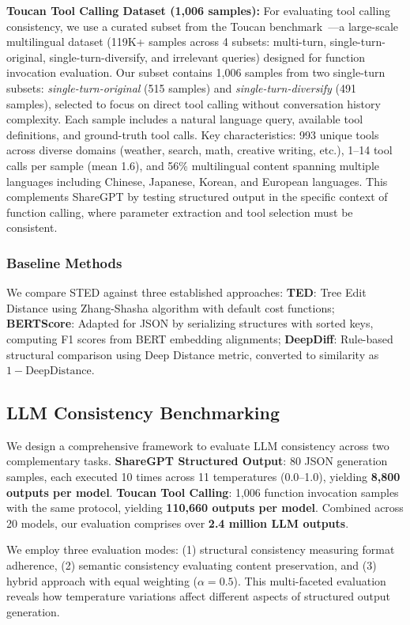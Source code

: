\documentclass{article}
\begin{document}
\textbf{Toucan Tool Calling Dataset (1,006 samples):} For evaluating tool calling consistency, we use a curated subset from the Toucan benchmark~\cite{toucan2024}---a large-scale multilingual dataset (119K+ samples across 4 subsets: multi-turn, single-turn-original, single-turn-diversify, and irrelevant queries) designed for function invocation evaluation. Our subset contains 1,006 samples from two single-turn subsets: \textit{single-turn-original} (515 samples) and \textit{single-turn-diversify} (491 samples), selected to focus on direct tool calling without conversation history complexity. Each sample includes a natural language query, available tool definitions, and ground-truth tool calls. Key characteristics: 993 unique tools across diverse domains (weather, search, math, creative writing, etc.), 1--14 tool calls per sample (mean 1.6), and 56\% multilingual content spanning multiple languages including Chinese, Japanese, Korean, and European languages. This complements ShareGPT by testing structured output in the specific context of function calling, where parameter extraction and tool selection must be consistent.

\subsubsection{Baseline Methods}
We compare STED against three established approaches: \textbf{TED}: Tree Edit Distance using Zhang-Shasha algorithm with default cost functions; \textbf{BERTScore}: Adapted for JSON by serializing structures with sorted keys, computing F1 scores from BERT embedding alignments; \textbf{DeepDiff}: Rule-based structural comparison using Deep Distance metric, converted to similarity as $1 - \text{DeepDistance}$.

\subsection{LLM Consistency Benchmarking}

We design a comprehensive framework to evaluate LLM consistency across two complementary tasks. \textbf{ShareGPT Structured Output}: 80 JSON generation samples, each executed 10 times across 11 temperatures (0.0--1.0), yielding \textbf{8,800 outputs per model}. \textbf{Toucan Tool Calling}: 1,006 function invocation samples with the same protocol, yielding \textbf{110,660 outputs per model}. Combined across 20 models, our evaluation comprises over \textbf{2.4 million LLM outputs}.

We employ three evaluation modes: (1) structural consistency measuring format adherence, (2) semantic consistency evaluating content preservation, and (3) hybrid approach with equal weighting ($\alpha = 0.5$). This multi-faceted evaluation reveals how temperature variations affect different aspects of structured output generation.
\end{document}
